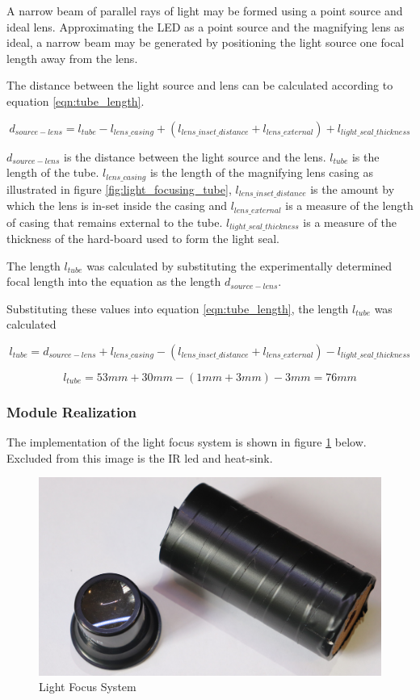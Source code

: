 A narrow beam of parallel rays of light may be formed using a point source and ideal lens. Approximating the LED as a point source and the magnifying lens as ideal, a narrow beam may be generated by positioning the light source one focal length away from the lens.

The distance between the light source and lens can be calculated according to equation \ref{eqn:tube_length}.

\begin{equation}
d_{source-lens} = l_{tube} - l_{lens\_casing} + (l_{lens\_inset\_distance} + l_{lens\_external}) + l_{light\_seal\_thickness}
\label{eqn:tube_length}
\end{equation}

$d_{source-lens}$ is the distance between the light source and the lens. $l_{tube}$ is the length of the tube. $l_{lens\_casing}$ is the length of the magnifying lens casing as illustrated in figure \ref{fig:light_focusing_tube}, $l_{lens\_inset\_distance}$ is the amount by which the lens is in-set inside the casing and $l_{lens\_external}$ is a measure of the length of casing that remains external to the tube. $l_{light\_seal\_thickness}$ is a measure of the thickness of the hard-board used to form the light seal.

The length $l_{tube}$ was calculated by substituting the experimentally determined focal length into the equation as the length $d_{source-lens}$.

Substituting these values into equation \ref{eqn:tube_length}, the length $l_{tube}$ was calculated

\[l_{tube} = d_{source-lens} + l_{lens\_casing} - (l_{lens\_inset\_distance} + l_{lens\_external}) - l_{light\_seal\_thickness}\]

\[l_{tube} = 53mm + 30mm - (1mm + 3mm) - 3mm = 76mm\]


\subsubsection{Module Realization}
The implementation of the light focus system is shown in figure \ref{fig:module_light_focus} below. Excluded from this image is the IR led and heat-sink.

\begin{figure}[H]
	\centering
	\includegraphics[width=.6\textwidth]{figures/modules/light_focus_tube_lens.jpg}
	\caption{Light Focus System}
	\label{fig:module_light_focus}
\end{figure}



